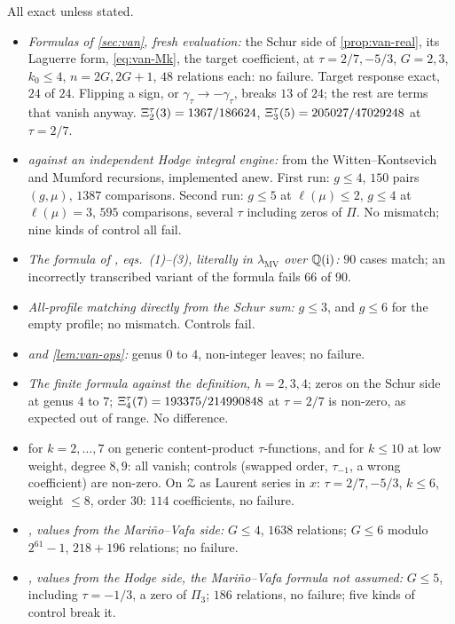 All exact unless stated.
\begin{itemize}
\item \emph{Formulas of \cref{sec:van}, fresh evaluation:} the Schur side of \cref{prop:van-real}, its Laguerre form, \cref{eq:van-Mk}, the target coefficient, at $\tau=2/7,-5/3$, $G=2,3$, $k_0\leq 4$, $n=2G,2G+1$, $48$ relations each: no failure. Target response exact, $24$ of $24$. Flipping a sign, or $\gamma_{\tau}\to-\gamma_{\tau}$, breaks $13$ of $24$; the rest are terms that vanish anyway. $\Xi^{\tau}_2(3)=1367/186624$, $\Xi^{\tau}_3(5)=205027/47029248$ at $\tau=2/7$.
\item \emph{ against an independent Hodge integral engine:} from the Witten--Kontsevich and Mumford recursions, implemented anew. First run: $g\leq 4$, $150$ pairs $(g,\mu)$, $1387$ comparisons. Second run: $g\leq 5$ at $\ell(\mu)\leq 2$, $g\leq 4$ at $\ell(\mu)=3$, $595$ comparisons, several $\tau$ including zeros of $\Pi$. No mismatch; nine kinds of control all fail.
\item \emph{The formula of \cite{LLZ03}, eqs.~(1)--(3), literally in $\lambda_{\mathrm{MV}}$ over $\mathbb{Q}(\mathrm{i})$:} $90$ cases match; an incorrectly transcribed variant of the formula fails $66$ of $90$.
\item \emph{All-profile matching directly from the Schur sum:} $g\leq 3$, and $g\leq 6$ for the empty profile; no mismatch. Controls fail.
\item \emph{ and \cref{lem:van-ops}:} genus $0$ to $4$, non-integer leaves; no failure.
\item \emph{The finite formula against the definition,} $h=2,3,4$; zeros on the Schur side at genus $4$ to $7$; $\Xi^{\tau}_4(7)=193375/214990848$ at $\tau=2/7$ is non-zero, as expected out of range. No difference.
\item \emph{} for $k=2,\dots,7$ on generic content-product $\tau$-functions, and for $k\leq 10$ at low weight, degree $8,9$: all vanish; controls (swapped order, $\tau_{-1}$, a wrong coefficient) are non-zero. On $\mathcal{Z}$ as Laurent series in $x$: $\tau=2/7,-5/3$, $k\leq 6$, weight $\leq 8$, order $30$: $114$ coefficients, no failure.
\item \emph{, values from the Mari\~no--Vafa side:} $G\leq 4$, $1638$ relations; $G\leq 6$ modulo $2^{61}-1$, $218+196$ relations; no failure.
\item \emph{, values from the Hodge side, the Mari\~no--Vafa formula not assumed:} $G\leq 5$, including $\tau=-1/3$, a zero of $\Pi_3$; $186$ relations, no failure; five kinds of control break it.

\end{itemize}
